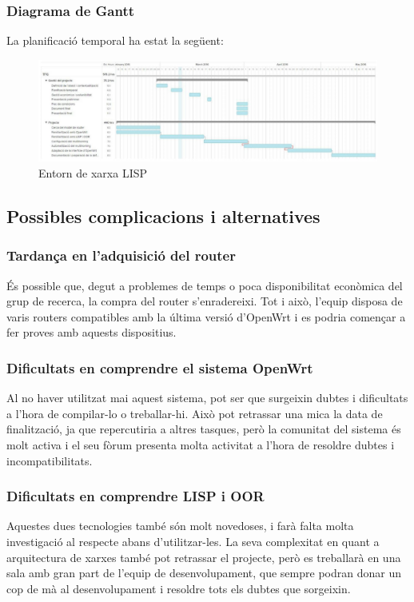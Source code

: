 \documentclass[11pt]{article}
\begin{document}
	\subsubsection{Diagrama de Gantt}
	La planificació temporal ha estat la següent:\\
	\begin{figure}[h]
		\centering
		\includegraphics[width=14cm]{gantt1}
		\caption{Entorn de xarxa LISP}
	\end{figure}	

\subsection{Possibles complicacions i alternatives}
\subsubsection{Tardança en l’adquisició del router}
És possible que, degut a problemes de temps o poca disponibilitat econòmica del grup de recerca, la compra del router s’enradereixi. Tot i això, l’equip disposa de varis routers compatibles amb la última versió d’OpenWrt i es podria començar a fer proves amb aquests dispositius.
\subsubsection{Dificultats en comprendre el sistema OpenWrt}
Al no haver utilitzat mai aquest sistema, pot ser que surgeixin dubtes i dificultats a l’hora de compilar-lo o treballar-hi. Això pot retrassar una mica la data de finalització, ja que repercutiria a altres tasques, però la comunitat del sistema és molt activa i el seu fòrum presenta molta activitat a l’hora de resoldre dubtes i incompatibilitats.
\subsubsection{Dificultats en comprendre LISP i OOR}
Aquestes dues tecnologies també són molt novedoses, i farà falta molta investigació al respecte abans d’utilitzar-les. La seva complexitat en quant a arquitectura de xarxes també pot retrassar el projecte, però es treballarà en una sala amb gran part de l’equip de desenvolupament, que sempre podran donar un cop de mà al desenvolupament i resoldre tots els dubtes que sorgeixin.
\end{document}
